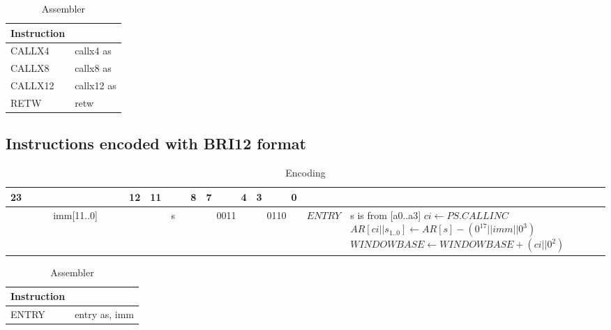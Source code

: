 \begin{longtable}{|p{5cm}|p{5cm}|}
	\caption{Assembler\label{long}}\\
	\hline
	Instruction & \\
	\hline
	CALLX4 & callx4 as\\ \hline
	CALLX8 & callx8 as\\ \hline
	CALLX12 & callx12 as\\ \hline
	RETW & retw\\ \hline
\end{longtable}

\newpage

\subsection{Instructions encoded with BRI12 format}
\begin{longtable}{llllllllllllllllllllllll  p{1cm}  p{7cm} | }
	\caption{Encoding\label{long}}\\
	23 & & & & & & & & & & & 12 & 11 & & & 8 & 7 & & & 4 & 3 & & & 0 & &
	\multicolumn{1}{c}{}\\
	\hline
	\multicolumn{12}{|c|}{imm[11..0]} & \multicolumn{4}{c|}{s} & \multicolumn{4}{c|}{0011} & \multicolumn{4}{c|}{0110} & \multicolumn{1}{c|}{$ENTRY$} & s is from [a0..a3] \newline $ci \leftarrow PS.CALLINC$ \newline $AR[ci||s_{1..0}] \leftarrow AR[s] - (0^{17}||imm||0^3)$ \newline $WINDOWBASE \leftarrow WINDOWBASE + (ci||0^2)$ \\ \hline
\end{longtable}

\begin{longtable}{|p{5cm}|p{5cm}|}
	\caption{Assembler\label{long}}\\		
	\hline
	Instruction & \\
	\hline
	ENTRY & entry as, imm\\ \hline
\end{longtable}

